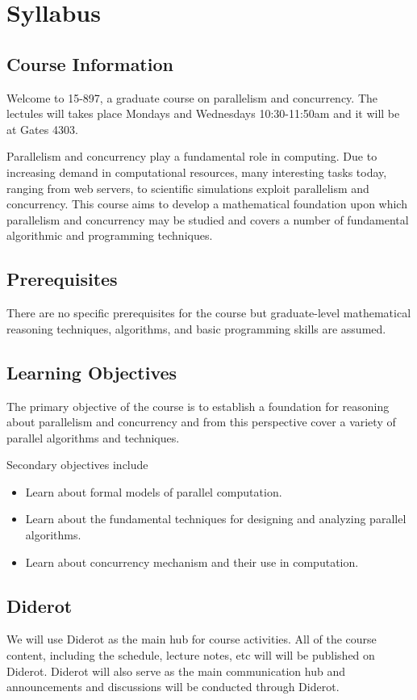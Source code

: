 \chapter*{Syllabus}
\label{ch:syllabus}

\section{Course Information}

Welcome to 15-897, a graduate course on parallelism and concurrency. 
%
The lectules will takes place Mondays and Wednesdays 10:30-11:50am and it will be at Gates 4303. 

Parallelism and concurrency play a  fundamental role in computing.
%
Due to increasing demand in computational resources, many interesting tasks today, ranging from web servers, to scientific simulations exploit parallelism and concurrency.
%
This course aims to develop a mathematical foundation upon which parallelism and concurrency may be studied and covers a number of fundamental algorithmic and programming techniques.  
%
 


\section{Prerequisites}
There are no specific prerequisites for the course but graduate-level mathematical reasoning techniques, algorithms, and basic programming skills are assumed.
%

\section{Learning Objectives}

The primary objective of the course is to establish a foundation for reasoning about parallelism and concurrency and from this perspective cover a variety of parallel algorithms and techniques.

Secondary objectives include
\begin{itemize}
\item Learn about formal models of parallel computation.
\item Learn about the fundamental techniques for designing and analyzing parallel algorithms.
\item Learn about concurrency mechanism and their use in computation. 
\end{itemize}


\section{Diderot}
We will use Diderot as the main hub for course activities.
%
All of the course content, including the schedule, lecture notes, etc will 
will be published on Diderot. 
%
Diderot will also serve as the main communication hub and
announcements and discussions will be conducted through Diderot.
%


